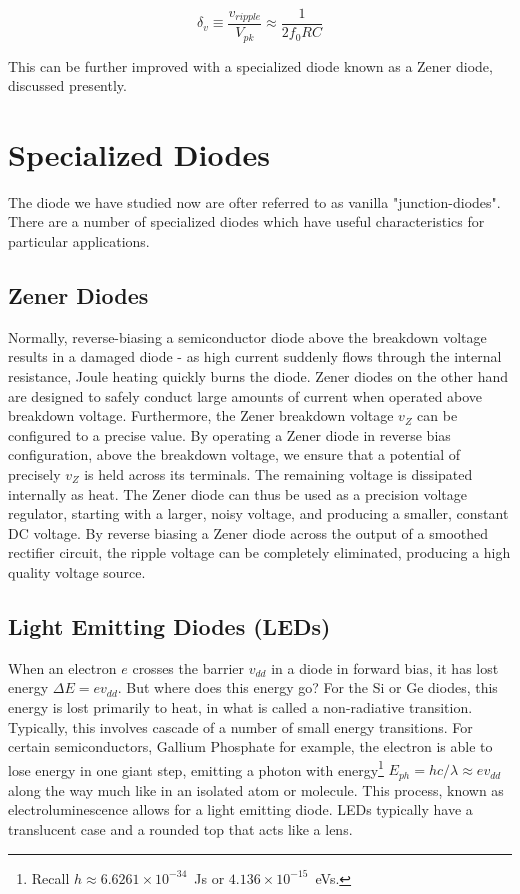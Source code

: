 \documentclass{tufte-book}
\begin{document}
\begin{equation}
\label{eq:rel_ripple}
\delta_v \equiv  \frac{v_{ripple}}{V_{pk}} \approx  \frac{1}{2f_0RC}
\end{equation}

This can be further improved with a specialized diode known as a Zener diode, discussed presently.

\section{Specialized Diodes}
The diode we have studied now are ofter referred to as vanilla "junction-diodes". There are a number of specialized diodes which have useful characteristics for particular applications.

\subsection{Zener Diodes}
Normally, reverse-biasing a semiconductor diode above the breakdown voltage results in a damaged diode - as high current suddenly flows through the internal resistance, Joule heating quickly burns the diode. 
Zener diodes on the other hand are designed to safely conduct large amounts of current when operated above breakdown voltage. 
Furthermore, the Zener breakdown voltage $v_Z$ can be configured to a precise value. 
By operating a Zener diode in reverse bias configuration, above the breakdown voltage, we ensure that a potential of precisely $v_Z$ is held across its terminals. 
The remaining voltage is dissipated internally as heat.
The Zener diode can thus be used as a precision voltage regulator, starting with a larger, noisy voltage, and producing a smaller, constant DC voltage. 
By reverse biasing a Zener diode across the output of a smoothed rectifier circuit, the ripple voltage can be completely eliminated, producing a high quality voltage source. 

\subsection{Light Emitting Diodes (LEDs)}
When an electron $e$ crosses the barrier $v_{dd}$ in a diode in forward bias, it has lost energy $\Delta E = ev_{dd}$. But where does this energy go? For the Si or Ge diodes, this energy is lost primarily to heat, in what is called a non-radiative transition. Typically, this involves cascade of a number of small  energy transitions. For certain semiconductors, Gallium Phosphate for example, the electron is able to lose energy in one giant step, emitting a photon with energy\footnote{Recall $h \approx 6.6261\times10^{-34}$~Js or $4.136\times10^{-15}$~eVs.} $E_{ph} = hc/\lambda \approx ev_{dd}$ along the way much like in an isolated atom or molecule. This process, known as electroluminescence allows for a light emitting diode. LEDs typically have a translucent case and a rounded top that acts like a lens.
\end{document}
